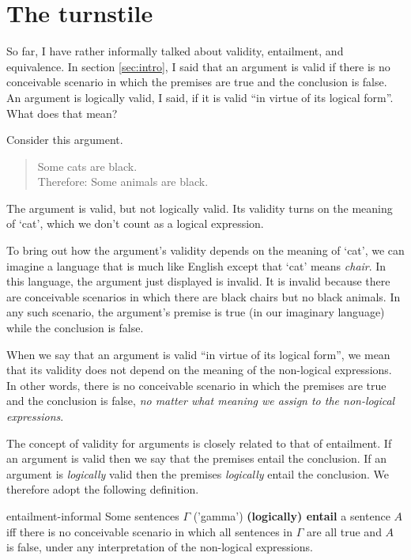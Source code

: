 \section{The turnstile}
\label{sec:turnstile}

So far, I have rather informally talked about validity, entailment, and
equivalence. In section \ref{sec:intro}, I said that an argument is valid if
there is no conceivable scenario in which the premises are true and the
conclusion is false. An argument is logically valid, I said, if it is valid ``in
virtue of its logical form''. What does that mean?

Consider this argument.
%
\begin{quote}
  Some cats are black.\\
  Therefore: Some animals are black.
\end{quote}
%
The argument is valid, but not logically valid. Its validity turns on the
meaning of `cat', which we don't count as a logical expression.

To bring out how the argument's validity depends on the meaning of `cat', we can
imagine a language that is much like English except that `cat' means
\emph{chair}. In this language, the argument just displayed is invalid. It is
invalid because there are conceivable scenarios in which there are black chairs
but no black animals. In any such scenario, the argument's premise is true (in
our imaginary language) while the conclusion is false.

When we say that an argument is valid ``in virtue of its logical form'', we mean
that its validity does not depend on the meaning of the non-logical expressions.
In other words, there is no conceivable scenario in which the premises are true
and the conclusion is false, \emph{no matter what meaning we assign to the
  non-logical expressions}.

The concept of validity for arguments is closely related to that of entailment.
If an argument is valid then we say that the premises entail the conclusion. If
an argument is \emph{logically} valid then the premises \emph{logically} entail
the conclusion. We therefore adopt the following definition.

\begin{definition}{}{entailment-informal}
  Some sentences $\Gamma$ ('gamma') \textbf{(logically) entail} a sentence $A$
  iff there is no conceivable scenario in which all sentences in $\Gamma$ are
  all true and $A$ is false, under any interpretation of the non-logical
  expressions.
\end{definition}

